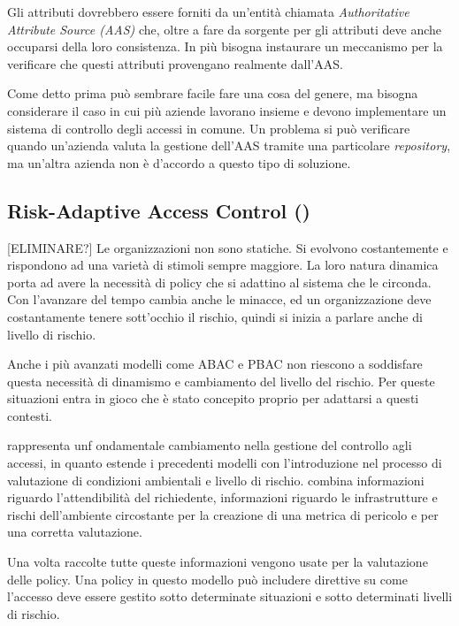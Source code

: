 Gli attributi dovrebbero essere forniti da un'entità chiamata \textit{Authoritative Attribute Source (AAS)} che, oltre a fare da sorgente per gli attributi deve anche occuparsi della loro consistenza.
In più bisogna instaurare un meccanismo per la verificare che questi attributi provengano realmente dall'AAS.\\ \par
Come detto prima può sembrare facile fare una cosa del genere, ma bisogna considerare il caso in cui più aziende lavorano insieme e devono implementare un sistema di controllo degli accessi in comune. Un problema si può verificare quando un'azienda valuta la gestione dell'AAS tramite una particolare \textit{repository}, ma un'altra azienda non è d'accordo a questo tipo di soluzione.


\subsection*{Risk-Adaptive Access Control (\radac)} %
\label{sub:risk_adaptive_access_control_}
[ELIMINARE?]
Le organizzazioni non sono statiche. Si evolvono costantemente e rispondono ad una varietà di stimoli sempre maggiore. La loro natura dinamica porta ad avere la necessità di policy che si adattino al sistema che le circonda. Con l'avanzare del tempo cambia anche le minacce, ed un organizzazione deve costantamente tenere sott'occhio il rischio, quindi si inizia a parlare anche di livello di rischio.\\ \par
Anche i più avanzati modelli come ABAC e PBAC non riescono a soddisfare questa necessità di dinamismo e cambiamento del livello del rischio. Per queste situazioni entra in gioco \radac che è stato concepito proprio per adattarsi a questi contesti.\\ \par
\radac rappresenta unf ondamentale cambiamento nella gestione del controllo agli accessi, in quanto estende i precedenti modelli con l'introduzione nel processo di valutazione di condizioni ambientali e livello di rischio.
\radac combina informazioni riguardo l'attendibilità del richiedente, informazioni riguardo le infrastrutture e rischi dell'ambiente circostante per la creazione di una metrica di pericolo e per una corretta valutazione.\\ \par
Una volta raccolte tutte queste informazioni vengono usate per la valutazione delle policy. Una policy in questo modello può includere direttive su come l'accesso deve essere gestito sotto determinate situazioni e sotto determinati livelli di rischio.\\ \par
